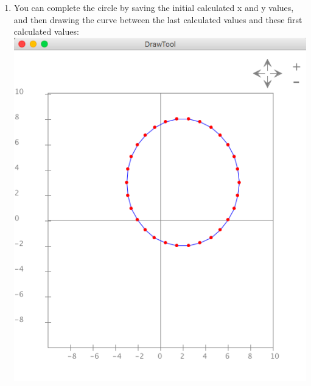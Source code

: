 \documentclass{article}
\begin{document}
\begin{enumerate}
\item You can complete the circle by saving the initial calculated x and y values, and then drawing the curve between the last calculated values and these first calculated values:\\
\includegraphics[scale=0.4]{exercise22}


\end{enumerate}
\end{document}
